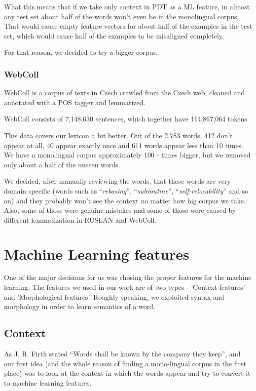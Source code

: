 \documentclass[letterpaper]{article}
\begin{document}
What this means that if we take only context in PDT as a ML feature, in almost 
any test set about half of the words won't even be in the monolingual corpus. 
That would cause empty feature vectors for about half of the examples in the test 
set, which would cause half of the examples to be misaligned completely.

For that reason, we decided to try a bigger corpus.

\subsubsection{WebColl}

WebColl\cite{webcoll} is a corpus of texts in Czech crawled from the Czech web, cleaned and annotated  with a POS tagger and lemmatized.

WebColl consists of 7,148,630 sentences, which together have 114,867,064 tokens. 

This data covers our lexicon a bit better. Out of the 2,783 words, 412 don't appear at all, 
40 appear exactly once and 611 words appear less than 10 times. We have a monolingual 
corpus approximately 100 - times bigger, but we removed only about a half of the unseen words.

We decided, after manually reviewing the words, that those words are very domain specific 
(words such as ``\emph{rebasing}'', ``\emph{subroutine}'', ``\emph{self-relocability}'' and so on) 
and they probably won't see the context no matter how big corpus we take. 
Also, some of those were genuine mistakes and some of those were caused by different lemmatization in RUSLAN and WebColl.


\section{Machine Learning features}
One of the major decisions for us was chosing the proper 
features for the machine learning. The features we used in our work are
of two types - 'Context features' and 'Morphological features'. 
Roughly speaking, we exploited syntax and morphology in order to learn semantics of a word.  

\subsection{Context}
As J. R. Firth stated ``Words shall be known by the company they keep'',
and our first idea (and the whole reason of finding a mono-lingual corpus in the first place) 
was to look at the context in which the words appear and try to convert it to machine learning features.
\end{document}
